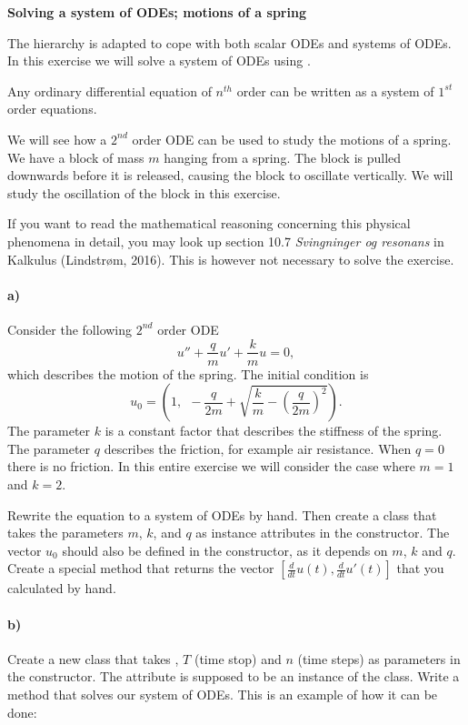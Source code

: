 \begin{Problem}{\textbf{Solving a system of ODEs; motions of a spring}} 


The  hierarchy is adapted to cope with both scalar ODEs and systems of ODEs. In this exercise we will solve a system of ODEs using .

Any ordinary differential equation of $n^{th}$ order can be written as a system of $1^{st}$ order equations.


We will see how a $2^{nd}$ order ODE can be used to study the motions of a spring. We have a block of mass $m$ hanging from a spring. The block is pulled downwards before it is released, causing the block to oscillate vertically. We will study the oscillation of the block in this exercise.


If you want to read the mathematical reasoning concerning this physical phenomena in detail, you may look up section 10.7 \textit{Svingninger og resonans} in Kalkulus (Lindstrøm, 2016). This is however not necessary to solve the exercise.

\paragraph{a)}
Consider the following $2^{nd}$ order ODE
\begin{equation*}
u'' + \frac{q}{m}u' + \frac{k}{m}u = 0, 
\end{equation*}
which describes the motion of the spring. The initial condition is 
\begin{equation*}
u_0 = \left(1, \ \ -\frac{q}{2m}+\sqrt{\frac{k}{m}-\left(\frac{q}{2m}\right)^2 }\right).
\end{equation*}
The parameter $k$ is a constant factor that describes the stiffness of the spring. The parameter $q$ describes the friction, for example air resistance. When $q=0$ there is no friction. In this entire exercise we will consider the case where $m=1$ and $k=2$.


Rewrite the equation to a system of ODEs by hand. 
Then create a class  that takes the parameters $m$, $k$, and $q$ as instance attributes in the constructor. The vector $u_0$ should also be defined in the constructor, as it depends on $m$, $k$ and $q$. Create a special method  that returns the vector $\left[\frac{d}{dt}u(t), \frac{d}{dt}u'(t) \right]$ that you calculated by hand.


\paragraph{b)}
Create a new class  that takes , $T$ (time stop) and $n$ (time steps) as parameters in the constructor. The  attribute is supposed to be an instance of the  class. Write a method  that solves our system of ODEs. This is an example of how it can be done:


\end{Problem}
